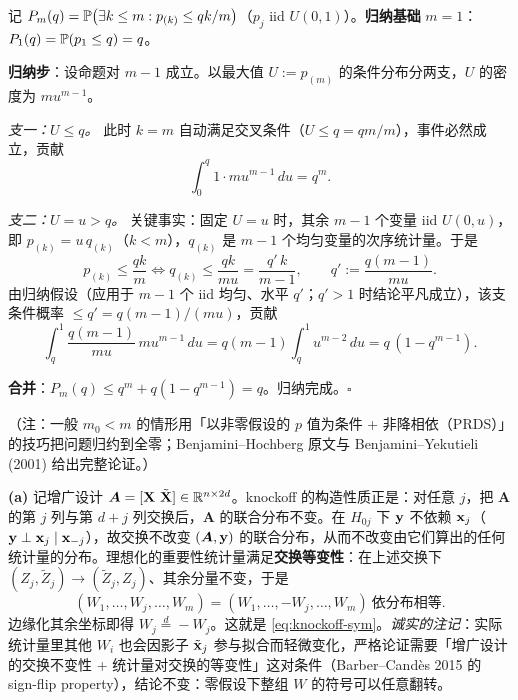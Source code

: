 \begin{description}[style=nextline, itemsep=1.2ex]
\item[练习 \ref{ex:bh-proof}（全零独立情形 $\mathrm{FDR} \le q$ 的归纳证明）]
记 $P_m(q) = \mathbb{P}\big( \exists k \le m : p_{(k)} \le qk/m \big)$（$p_j$ iid $U(0,1)$）。\textbf{归纳基础} $m=1$：$P_1(q) = \mathbb{P}(p_1 \le q) = q$。

\textbf{归纳步}：设命题对 $m-1$ 成立。以最大值 $U := p_{(m)}$ 的条件分布分两支，$U$ 的密度为 $m u^{m-1}$。

\textit{支一：$U \le q$。} 此时 $k=m$ 自动满足交叉条件（$U \le q = qm/m$），事件必然成立，贡献
\[
  \int_0^q 1 \cdot m u^{m-1}\, du = q^{m}.
\]

\textit{支二：$U = u > q$。} 关键事实：固定 $U = u$ 时，其余 $m-1$ 个变量 iid $U(0, u)$，即 $p_{(k)} = u\, q_{(k)}$（$k < m$），$q_{(k)}$ 是 $m-1$ 个均匀变量的次序统计量。于是
\[
  p_{(k)} \le \frac{qk}{m}
  \iff q_{(k)} \le \frac{q k}{m u}
  = \frac{q'\, k}{m-1},
  \qquad q' := \frac{q(m-1)}{m u}.
\]
由归纳假设（应用于 $m-1$ 个 iid 均匀、水平 $q'$；$q' > 1$ 时结论平凡成立），该支条件概率 $\le q' = q(m-1)/(mu)$，贡献
\[
  \int_q^1 \frac{q(m-1)}{m u}\, m u^{m-1}\, du
  = q(m-1) \int_q^1 u^{m-2}\, du
  = q\,(1 - q^{m-1}).
\]

\textbf{合并}：$P_m(q) \le q^m + q(1 - q^{m-1}) = q$。归纳完成。$\square$

（注：一般 $m_0 < m$ 的情形用「以非零假设的 $p$ 值为条件 + 非降相依（PRDS）」的技巧把问题归约到全零；Benjamini--Hochberg 原文与 Benjamini--Yekutieli (2001) 给出完整论证。）

\item[练习 \ref{ex:knockoff}（交换性论证）]
\textbf{(a)} 记增广设计 $\bm{A} = [\mathbf{X}\ \tilde{\mathbf{X}}] \in \mathbb{R}^{n \times 2d}$。knockoff 的构造性质正是：对任意 $j$，把 $\bm{A}$ 的第 $j$ 列与第 $d+j$ 列交换后，$\bm{A}$ 的联合分布不变。在 $H_{0j}$ 下 $\mathbf{y}$ 不依赖 $\mathbf{x}_j$（$\mathbf{y} \perp \mathbf{x}_j \mid \mathbf{x}_{-j}$），故交换不改变 $(\bm{A}, \mathbf{y})$ 的联合分布，从而不改变由它们算出的任何统计量的分布。理想化的重要性统计量满足\textbf{交换等变性}：在上述交换下 $(Z_j, \tilde{Z}_j) \to (\tilde{Z}_j, Z_j)$、其余分量不变，于是
\[
  (W_1, \dots, W_j, \dots, W_m)
  = (W_1, \dots, -\!W_j, \dots, W_m) \ \text{依分布相等}.
\]
边缘化其余坐标即得 $W_j \overset{d}{=} -W_j$。这就是 \eqref{eq:knockoff-sym}。\textit{诚实的注记}：实际统计量里其他 $W_i$ 也会因影子 $\tilde{\mathbf{x}}_j$ 参与拟合而轻微变化，严格论证需要「增广设计的交换不变性 + 统计量对交换的等变性」这对条件（Barber--Candès 2015 的 sign-flip property），结论不变：零假设下整组 $W$ 的符号可以任意翻转。


\end{description}
